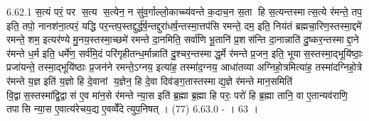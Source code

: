 6.62.1
स॒त्यं परं॒ पर स॒त्य स॒त्येन॒ न सु॑व॒र्गाल्लो॒काच्च्य॑वन्ते क॒दाच॒न स॒ता हि स॒त्यन्तस्मात्स॒त्ये र॑मन्ते॒ तप॒ इति॒ तपो॒ नानश॑ना॒त्परं॒ यद्धि पर॒न्तप॒स्तद्दुर्द्ध॑र्\mbox{}ष॒न्तद्दुरा॑धर्\mbox{}ष॒न्तस्मा॒त्तप॑सि रमन्ते॒ दम॒ इति॒ निय॑तं ब्रह्मचा॒रिण॒स्तस्मा॒द्दमे॑ रमन्ते॒ शम॒ इत्यर॑ण्ये मु॒नय॒स्तस्मा॒च्छमे॑ रमन्ते दा॒नमिति॒ सर्वा॑णि भू॒तानि॑ प्र॒शस॑न्ति दा॒नान्नाति॑ दु॒ष्कर॒न्तस्माद्दा॒ने र॑मन्ते ध॒र्म इति॒ धर्मे॑ण॒ सर्व॑मि॒दं परि॑गृहीतन्ध॒र्मान्नाति॑ दु॒श्चर॒न्तस्माद्ध॒र्मे र॑मन्ते प्र॒जन॒ इति॒ भूयास॒स्तस्मा॒द्भूयि॑ष्ठाः॒ प्रजा॑यन्ते॒ तस्मा॒द्भूयि॑ष्ठाः प्र॒जन॑ने रमन्ते॒ऽग्नय॒ इत्या॑ह॒ तस्मा॑द॒ग्नय॒ आधा॑तव्या अग्निहो॒त्रमित्या॑ह॒ तस्मा॑दग्निहो॒त्रे र॑मन्ते य॒ज्ञ इति॑ य॒ज्ञो हि दे॒वानां य॒ज्ञेन॒ हि दे॒वा दिव॑ङ्ग॒तास्तस्माद्य॒ज्ञे र॑मन्ते मान॒समिति॑ वि॒द्वास॒स्तस्मा॑द्वि॒द्वास॑ ए॒व मा॑न॒से र॑मन्ते न्या॒स इति॑ ब्र॒ह्मा ब्र॒ह्मा हि परः॒ परो॑ हि ब्र॒ह्मा तानि॒ वा ए॒तान्यव॑राणि॒ तपासि न्या॒स ए॒वात्य॑रेचय॒द्य ए॒वव्वेँदेत्युप॒निषत् । (77)
6.63.0
- । 63 ।
\anuvakamend

